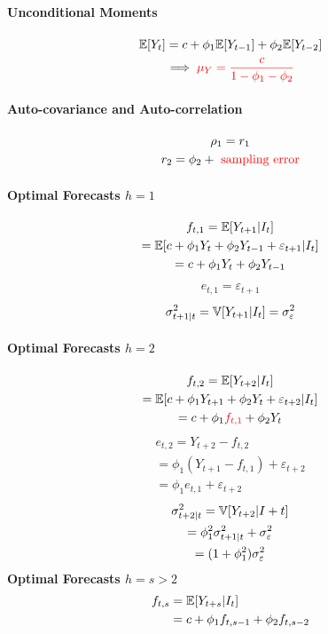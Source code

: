 \documentclass[11pt]{article}
\begin{document}
			\paragraph{Unconditional Moments}
				\begin{gather}
					\mathbb{E}[{Y_t}] = c + \phi_1 \mathbb{E}[{Y_{t-1}}] + \phi_2 \mathbb{E}[{Y_{t-2}}] \\
					\implies \textcolor{red}{\mu_Y = \frac{c}{1 - \phi_1 - \phi_2}}
				\end{gather}
			\paragraph{Auto-covariance and Auto-correlation}
				\begin{gather}
					\rho_1 = r_1 \\
					r_2 = \phi_2 + \textcolor{red}{\text{ sampling error}}
				\end{gather}
			\paragraph{Optimal Forecasts $h=1$}
				\begin{gather}
					f_{t,1} = \mathbb{E}[{Y_{t+1}|I_t}] \\
					= \mathbb{E}[{c + \phi_1 Y_t + \phi_2 Y_{t-1} + \varepsilon_{t+1}|I_t}] \\
					= c + \phi_1 Y_t + \phi_2 Y_{t-1}
				\end{gather}
				\begin{gather}
					e_{t,1} = \varepsilon_{t+1}
				\end{gather}
				\begin{gather}
					\sigma_{t+1|t}^2 = \mathbb{V}[{Y_{t+1}|I_t}] = \sigma_\varepsilon^2
				\end{gather}
			\paragraph{Optimal Forecasts $h=2$}
				\begin{gather}
					f_{t,2} = \mathbb{E}[{Y_{t+2}|I_t}] \\
					= \mathbb{E}[{c + \phi_1 Y_{t+1} + \phi_2 Y_t + \varepsilon_{t+2}|I_t}] \\
					= c + \phi_1 \textcolor{red}{f_{t,1}} + \phi_2 Y_t 
				\end{gather}
				\begin{gather}
					e_{t,2} = Y_{t+2} - f_{t,2} \\
					= \phi_1 (Y_{t+1} - f_{t,1}) + \varepsilon_{t+2} \\
					= \phi_1 e_{t,1} + \varepsilon_{t+2}
				\end{gather}
				\begin{gather}
					\sigma_{t+2|t}^2 = \mathbb{V}[{Y_{t+2}|I+t}] \\
					= \phi_1^2 \sigma_{t+1|t}^2 + \sigma_\varepsilon^2 \\
					= (1 + \phi_1^2) \sigma_\varepsilon^2
				\end{gather}
			\textbf{Optimal Forecasts $h=s>2$}
				\begin{align}
					f_{t, s} &= \mathbb{E}[{Y_{t+s}|I_t}] \\
					&= c + \phi_1 f_{t, s-1} + \phi_2 f_{t, s-2}
				\end{align}
				
\end{document}

